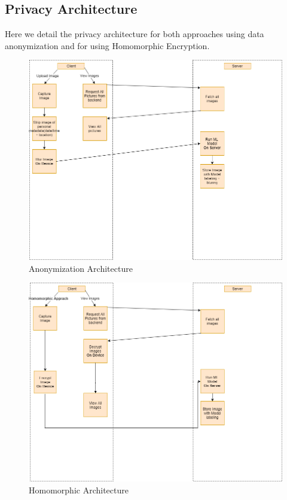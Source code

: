 \subsection{Privacy Architecture}
Here we detail the privacy architecture for both approaches using data anonymization and for using Homomorphic Encryption.
\begin{figure}[H]
  \centering
  \includegraphics[scale=0.4]{Non}
  \caption{Anonymization Architecture}
  \label{fig:Non}
  \end{figure}
  \begin{figure}[H]
    \centering
    \includegraphics[scale=0.55]{Encrypt}
    \caption{Homomorphic Architecture}
    \label{fig:Encrypted}
    \end{figure}
